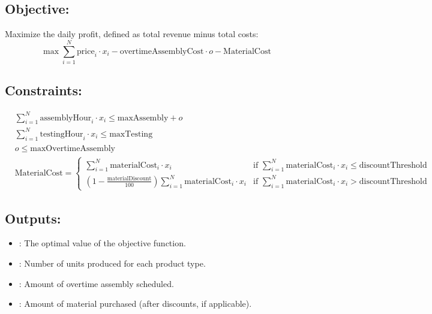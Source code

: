 \documentclass{article}
\begin{document}
\subsection*{Objective:}
Maximize the daily profit, defined as total revenue minus total costs:
\[
\max \sum_{i=1}^{N} \text{price}_i \cdot x_i - \text{overtimeAssemblyCost} \cdot o - \text{MaterialCost}
\]

\subsection*{Constraints:}
\begin{align}
    & \sum_{i=1}^{N} \text{assemblyHour}_i \cdot x_i \leq \text{maxAssembly} + o && \text{(Assembly hours, including overtime)} \\
    & \sum_{i=1}^{N} \text{testingHour}_i \cdot x_i \leq \text{maxTesting} && \text{(Testing hours)} \\
    & o \leq \text{maxOvertimeAssembly} && \text{(Overtime limit)} \\
    & \text{MaterialCost} = 
    \begin{cases} 
        \sum_{i=1}^{N} \text{materialCost}_i \cdot x_i & \text{if } \sum_{i=1}^{N} \text{materialCost}_i \cdot x_i \leq \text{discountThreshold} \\
        \left(1 - \frac{\text{materialDiscount}}{100}\right) \sum_{i=1}^{N} \text{materialCost}_i \cdot x_i & \text{if } \sum_{i=1}^{N} \text{materialCost}_i \cdot x_i > \text{discountThreshold}
    \end{cases}
\end{align}

\subsection*{Outputs:}
\begin{itemize}
    \item {}: The optimal value of the objective function.
    \item {}: Number of units produced for each product type.
    \item {}: Amount of overtime assembly scheduled.
    \item {}: Amount of material purchased (after discounts, if applicable).
\end{itemize}
\end{document}
